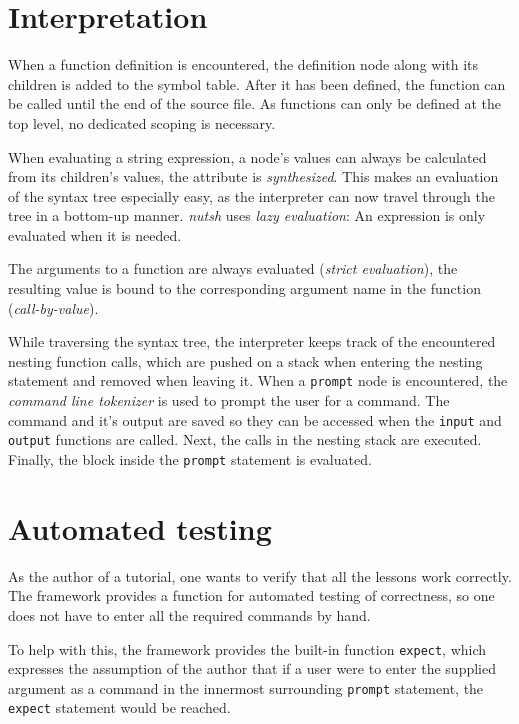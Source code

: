 \documentclass[paper=a4,twoside,abstract=on,cleardoublepage=empty,numbers=noenddot,toc=bib,toc=listof,12pt,appendixprefix=true]{scrreprt}
\begin{document}

\section{Interpretation}

When a function definition is encountered, the definition node along with its children is added to the symbol table. After it has been defined, the function can be called until the end of the source file. As functions can only be defined at the top level, no dedicated scoping is necessary.

When evaluating a string expression, a node's values can always be calculated from its children's values, the attribute is \emph{synthesized}. This makes an evaluation of the syntax tree especially easy, as the interpreter can now travel through the tree in a bottom-up manner. \emph{nutsh} uses \emph{lazy evaluation}: An expression is only evaluated when it is needed.

The arguments to a function are always evaluated (\emph{strict evaluation}), the resulting value is bound to the corresponding argument name in the function (\emph{call-by-value}).

While traversing the syntax tree, the interpreter keeps track of the encountered nesting function calls, which are pushed on a stack when entering the nesting statement and removed when leaving it. When a \texttt{prompt} node is encountered, the \emph{command line tokenizer} is used to prompt the user for a command. The command and it's output are saved so they can be accessed when the \texttt{input} and \texttt{output} functions are called. Next, the calls in the nesting stack are executed. Finally, the block inside the \texttt{prompt} statement is evaluated.
%
%

\section{Automated testing}
\label{sec:testing}

As the author of a tutorial, one wants to verify that all the lessons work correctly. The framework provides a function for automated testing of correctness, so one does not have to enter all the required commands by hand.

To help with this, the framework provides the built-in function \texttt{expect}, which expresses the assumption of the author that if a user were to enter the supplied argument as a command in the innermost surrounding \texttt{prompt} statement, the \texttt{expect} statement would be reached.
\end{document}
